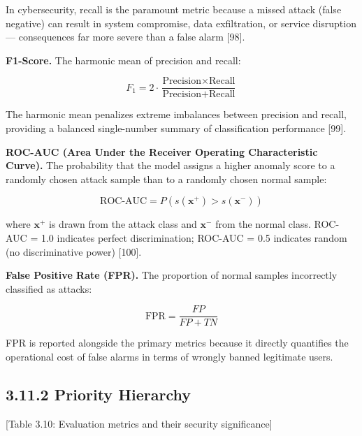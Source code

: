 \documentclass[
  a4paper]{report}
\begin{document}
In cybersecurity, recall is the paramount metric because a missed attack
(false negative) can result in system compromise, data exfiltration, or
service disruption --- consequences far more severe than a false alarm
{[}98{]}.

\textbf{F1-Score.} The harmonic mean of precision and recall:

\[F_1 = 2 \cdot \frac{\text{Precision} \times \text{Recall}}{\text{Precision} + \text{Recall}}\]

The harmonic mean penalizes extreme imbalances between precision and
recall, providing a balanced single-number summary of classification
performance {[}99{]}.

\textbf{ROC-AUC (Area Under the Receiver Operating Characteristic
Curve).} The probability that the model assigns a higher anomaly score
to a randomly chosen attack sample than to a randomly chosen normal
sample:

\[\text{ROC-AUC} = P(s(\mathbf{x}^+) > s(\mathbf{x}^-))\]

where \(\mathbf{x}^+\) is drawn from the attack class and
\(\mathbf{x}^-\) from the normal class. ROC-AUC = 1.0 indicates perfect
discrimination; ROC-AUC = 0.5 indicates random (no discriminative power)
{[}100{]}.

\textbf{False Positive Rate (FPR).} The proportion of normal samples
incorrectly classified as attacks:

\[\text{FPR} = \frac{FP}{FP + TN}\]

FPR is reported alongside the primary metrics because it directly
quantifies the operational cost of false alarms in terms of wrongly
banned legitimate users.

\subsection{3.11.2 Priority Hierarchy}\label{priority-hierarchy}

{[}Table 3.10: Evaluation metrics and their security significance{]}
\end{document}
